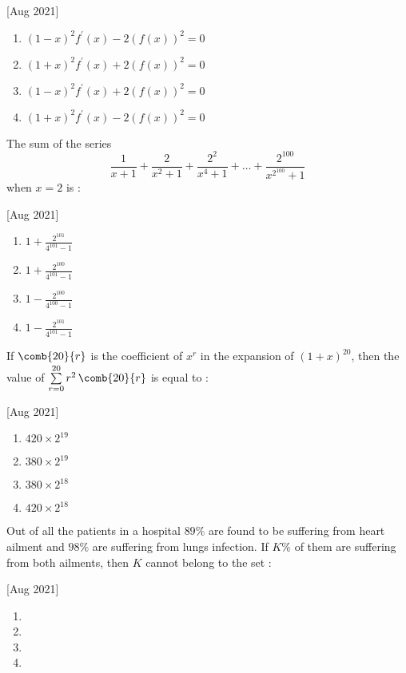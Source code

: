     \hfill[Aug 2021]
        \begin{enumerate}
            \item $(1-x)^2f^\prime(x)-2(f(x))^2=0$
            \item $(1+x)^2f^\prime(x)+2(f(x))^2=0$
            \item $(1-x)^2f^\prime(x)+2(f(x))^2=0$
            \item $(1+x)^2f^\prime(x)-2(f(x))^2=0$
        \end{enumerate}


    \item The sum of the series
        $$\frac{1}{x+1}+\frac{2}{x^2+1}+\frac{2^2}{x^4+1}+\dots+\frac{2^{100}}{x^{2^{100}}+1}$$ when $x=2$ is :
    
    \hfill[Aug 2021]
        \begin{enumerate}
            \item $1+\frac{2^{101}}{4^{101}-1}$
            \item $1+\frac{2^{100}}{4^{101}-1}$
            \item $1-\frac{2^{100}}{4^{100}-1}$
            \item $1-\frac{2^{101}}{4^{101}-1}$
        \end{enumerate}


    \item If $\comb{20}{r}$ is the coefficient of $x^r$ in the expansion of $(1+x)^{20}$, then the value of $\sum\limits_{r=0}^{20}r^2\,\comb{20}{r}$ is equal to :
    
    \hfill[Aug 2021]
        \begin{enumerate}
            \item $420\times2^{19}$
            \item $380\times2^{19}$
            \item $380\times2^{18}$
            \item $420\times2^{18}$
        \end{enumerate}

    \item Out of all the patients in a hospital $89\%$ are found to be suffering from heart ailment and $98\%$ are suffering from lungs infection. If $K\%$ of them are suffering from both ailments, then $K$ cannot belong to the set :
    
    \hfill[Aug 2021]
        \begin{enumerate}
            \item {}
            \item {}
            \item {}
            \item {} 
        \end{enumerate}


